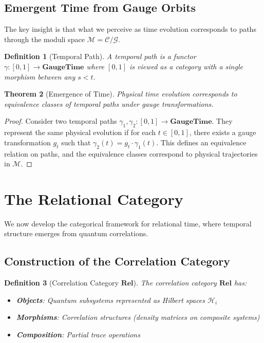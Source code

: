 \documentclass[12pt,a4paper]{article}
\newtheorem{theorem}{Theorem}[section]
\newtheorem{definition}[theorem]{Definition}
\newcommand{\GaugeGroup}{\mathcal{G}}
\newcommand{\Config}{\mathcal{C}}
\begin{document}
\subsection{Emergent Time from Gauge Orbits}

The key insight is that what we perceive as time evolution corresponds to paths through the moduli space $\mathcal{M} = \Config/\GaugeGroup$.

\begin{definition}[Temporal Path]
A temporal path is a functor $\gamma: [0,1] \to \mathbf{GaugeTime}$ where $[0,1]$ is viewed as a category with a single morphism between any $s < t$.
\end{definition}

\begin{theorem}[Emergence of Time]
Physical time evolution corresponds to equivalence classes of temporal paths under gauge transformations.
\end{theorem}

\begin{proof}
Consider two temporal paths $\gamma_1, \gamma_2: [0,1] \to \mathbf{GaugeTime}$. They represent the same physical evolution if for each $t \in [0,1]$, there exists a gauge transformation $g_t$ such that $\gamma_2(t) = g_t \cdot \gamma_1(t)$. This defines an equivalence relation on paths, and the equivalence classes correspond to physical trajectories in $\mathcal{M}$.
\end{proof}

\section{The Relational Category}

We now develop the categorical framework for relational time, where temporal structure emerges from quantum correlations.

\subsection{Construction of the Correlation Category}

\begin{definition}[Correlation Category $\mathbf{Rel}$]
The correlation category $\mathbf{Rel}$ has:
\begin{itemize}
\item \textbf{Objects}: Quantum subsystems represented as Hilbert spaces $\mathcal{H}_i$
\item \textbf{Morphisms}: Correlation structures (density matrices on composite systems)
\item \textbf{Composition}: Partial trace operations
\end{itemize}
\end{definition}
\end{document}
